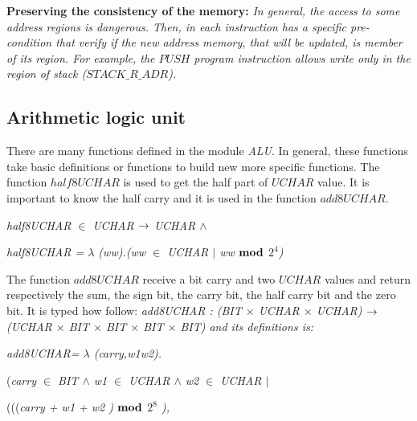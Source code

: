 \documentclass[11pt]{article} %
\begin{document}
\textbf{Preserving the consistency of the memory:} \emph{In general, the access to
some address regions is dangerous. Then, in each instruction has a specific pre-condition that verify
if the new address memory, that will be updated, is member of its region. For example, the $\mathit{PUSH}$
program instruction allows write only in the region of stack ($\mathit{STACK\_R\_ADR}$).}



\subsection{Arithmetic logic unit}
 
There are many functions defined in the module \textit{ALU}. In general, these functions take basic definitions or functions
to build new more specific functions. The function $\mathit{half8UCHAR}$ is used to get the half part of $\mathit{UCHAR}$ value.
It is important to know the half carry and it is used in the function $\mathit{add8UCHAR}$. 

\hspace*{0.0in}

\hspace*{0.0in}\it half8UCHAR  $\in$  \it UCHAR  $\fun$  \it UCHAR  $\land$ 

\hspace*{0.0in}\it half8UCHAR \rm =  $\lambda$  \rm (\it ww\rm )\rm .\rm (\it ww  $\in$  \it UCHAR  $\mid$  \it ww  $\mod$  \it $2^{4}$\rm )

\hspace*{0.0in}

 
The function $\mathit{add8UCHAR}$ receive a bit carry and two $\mathit{UCHAR}$ values and return respectively the 
sum, the sign bit, the carry bit, the half carry bit and the zero bit. It is typed how follow: \it add8UCHAR \rm :
\rm (\it BIT $\times$ \it UCHAR $\times$ \it UCHAR\rm ) $\fun$ \rm (\it UCHAR $\times$  \it BIT  $\times$  \it BIT  $\times$  \it BIT  $\times$  \it BIT\rm ) and its definitions is:

\hspace*{0.0in}\it add8UCHAR\rm = $\lambda$ \rm(\it carry\rm,\it w1\rm \it w2\rm)\rm.\rm

\hspace*{0.0in}(\it carry $\in$  \it BIT  $\land$  \it w1  $\in$  \it UCHAR  $\land$  \it w2  $\in$  \it UCHAR
$\mid$

\hspace*{0.40in}\rm(\rm(\rm(\it carry \rm + \it w1 \rm + \it w2 \rm )  $\mod$  \it $2^{8}$ \rm ),
\end{document}
